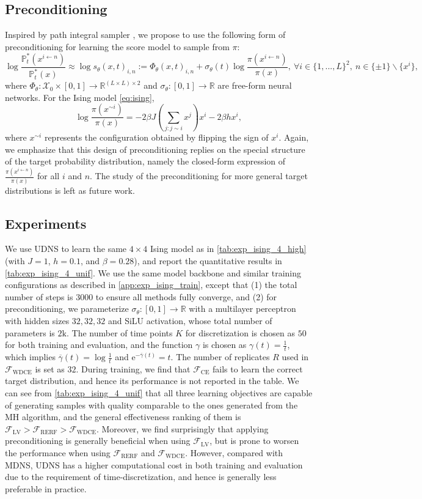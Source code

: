 \documentclass{article}
\theoremstyle{remark}
\newcommand{\ro}[1]{\left(#1\right)} %
\newcommand{\e}{\mathrm{e}}
\renewcommand{\P}{\mathbb{P}}
\newcommand{\R}{\mathbb{R}}
\newcommand{\cF}{\mathcal{F}}
\newcommand{\cX}{\mathcal{X}}
\newcommand{\gammab}{{\overline{\gamma}}}
\begin{document}
\subsection{Preconditioning}
\label{app:unif_precond}
Inspired by path integral sampler \cite{zhang2022path}, we propose to use the following form of preconditioning for learning the score model to sample from $\pi$:
$$\log\frac{\P^*_t(x^{i\gets n})}{\P^*_t(x)}\approx\log s_\theta(x,t)_{i,n}:=\Phi_\theta(x,t)_{i,n}+\sigma_\theta(t)\log\frac{\pi(x^{i\gets n})}{\pi(x)},~\forall i\in\{1,...,L\}^2,~n\in\{\pm1\}\backslash\{x^i\},$$
where $\Phi_\theta:\cX_0\times[0,1]\to\R^{(L\times L)\times2}$ and $\sigma_\theta:[0,1]\to\R$ are free-form neural networks. For the Ising model \cref{eq:ising},
$$\log\frac{\pi(x^{\sim i})}{\pi(x)}=-2\beta J\ro{\sum_{j:j\sim i}x^j}x^i-2\beta hx^i,$$
where $x^{\sim i}$ represents the configuration obtained by flipping the sign of $x^i$. Again, we emphasize that this design of preconditioning replies on the special structure of the target probability distribution, namely the closed-form expression of $\frac{\pi(x^{i\gets n})}{\pi(x)}$ for all $i$ and $n$. The study of the preconditioning for more general target distributions is left as future work.


\subsection{Experiments}
\label{app:unif_exp}
We use UDNS to learn the same $4\times4$ Ising model as in \cref{tab:exp_ising_4_high} (with $J=1$, $h=0.1$, and $\beta=0.28$), and report the quantitative results in \cref{tab:exp_ising_4_unif}. We use the same model backbone and similar training configurations as described in \cref{app:exp_ising_train}, except that (1) the total number of steps is $3000$ to ensure all methods fully converge, and (2) for preconditioning, we parameterize $\sigma_\theta:[0,1]\to\R$ with a multilayer perceptron with hidden sizes $32,32,32$ and SiLU activation, whose total number of parameters is $2\mathrm{k}$. The number of time points $K$ for discretization is chosen as $50$ for both training and evaluation, and the function $\gamma$ is chosen as $\gamma(t)=\frac{1}{t}$, which implies $\gammab(t)=\log\frac{1}{t}$ and $\e^{-\gammab(t)}=t$. The number of replicates $R$ used in $\cF_\mathrm{WDCE}$ is set as $32$. During training, we find that $\cF_\mathrm{CE}$ fails to learn the correct target distribution, and hence its performance is not reported in the table. We can see from \cref{tab:exp_ising_4_unif} that all three learning objectives are capable of generating samples with quality comparable to the ones generated from the MH algorithm, and the general effectiveness ranking of them is $\cF_\mathrm{LV}>\cF_\mathrm{RERF}>\cF_\mathrm{WDCE}$. Moreover, we find surprisingly that applying preconditioning is generally beneficial when using $\cF_\mathrm{LV}$, but is prone to worsen the performance when using $\cF_\mathrm{RERF}$ and $\cF_\mathrm{WDCE}$. However, compared with MDNS, UDNS has a higher computational cost in both training and evaluation due to the requirement of time-discretization, and hence is generally less preferable in practice.
\end{document}
